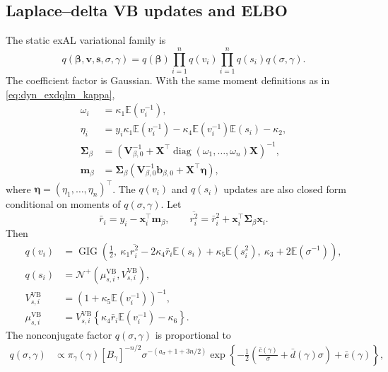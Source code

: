 \documentclass[nojss,noheadings]{jss}
\renewcommand{\E}{\mathbb{E}}
\newcommand{\diag}{\operatorname{diag}}
\newcommand{\vect}[1]{\bm{#1}}
\newcommand{\mat}[1]{\mathbf{#1}}
\newcommand{\TNp}{\mathcal{N}^{+}}
\newcommand{\GIG}{\operatorname{GIG}}
\newcommand{\pigamma}{\pi_\gamma}
\begin{document}
\subsection{Laplace--delta VB updates and ELBO}

The static exAL variational family is
\begin{equation}
q(\vect{\beta},\vect{v},\vect{s},\sigma,\gamma)
=q(\vect{\beta})\prod_{i=1}^nq(v_i)\prod_{i=1}^nq(s_i)q(\sigma,\gamma).
\label{eq:static_exal_mf}
\end{equation}
The coefficient factor is Gaussian. With the same moment definitions as in
\eqref{eq:dyn_exdqlm_kappa},
\begin{align}
\omega_i&=\kappa_1\E(v_i^{-1}),\\
\eta_i&=
y_i\kappa_1\E(v_i^{-1})
-\kappa_4\E(v_i^{-1})\E(s_i)
-\kappa_2,\\
\mat{\Sigma}_\beta
&=\left(\mat{V}_{\beta,0}^{-1}+\mat{X}^\top\diag(\omega_1,\ldots,\omega_n)\mat{X}\right)^{-1},\\
\vect{m}_\beta
&=\mat{\Sigma}_\beta
\left(\mat{V}_{\beta,0}^{-1}\vect{b}_{\beta,0}+\mat{X}^\top\vect{\eta}\right),
\label{eq:static_exal_vb_beta}
\end{align}
where $\vect{\eta}=(\eta_1,\ldots,\eta_n)^\top$. The $q(v_i)$ and $q(s_i)$
updates are also closed form conditional on moments of $q(\sigma,\gamma)$.
Let
\begin{equation}
\bar r_i=y_i-\vect{x}_i^\top\vect{m}_\beta,\qquad
\overline{r_i^2}=\bar r_i^2+\vect{x}_i^\top\mat{\Sigma}_\beta\vect{x}_i.
\end{equation}
Then
\begin{align}
q(v_i)
&=
\GIG\left(
\frac{1}{2},\
\kappa_1\overline{r_i^2}
-2\kappa_4\bar r_i\E(s_i)
+\kappa_5\E(s_i^2),\
\kappa_3+2\E(\sigma^{-1})
\right),\\
q(s_i)&=\TNp(\mu_{s,i}^{\mathrm{VB}},V_{s,i}^{\mathrm{VB}}),\\
V_{s,i}^{\mathrm{VB}}
&=\left(1+\kappa_5\E(v_i^{-1})\right)^{-1},\\
\mu_{s,i}^{\mathrm{VB}}
&=V_{s,i}^{\mathrm{VB}}
\left\{\kappa_4\bar r_i\E(v_i^{-1})-\kappa_6\right\}.
\label{eq:static_exal_vb_vs}
\end{align}
The nonconjugate factor $q(\sigma,\gamma)$ is proportional to
\begin{align}
q(\sigma,\gamma)
&\propto
\pigamma(\gamma)[B_\gamma]^{-n/2}
\sigma^{-(a_\sigma+1+3n/2)}
\exp\left\{
-\frac{1}{2}\left(\frac{\bar c(\gamma)}{\sigma}
+\bar d(\gamma)\sigma\right)+\bar e(\gamma)
\right\},
\label{eq:static_exal_q_sigmagam}
\end{align}
\end{document}
